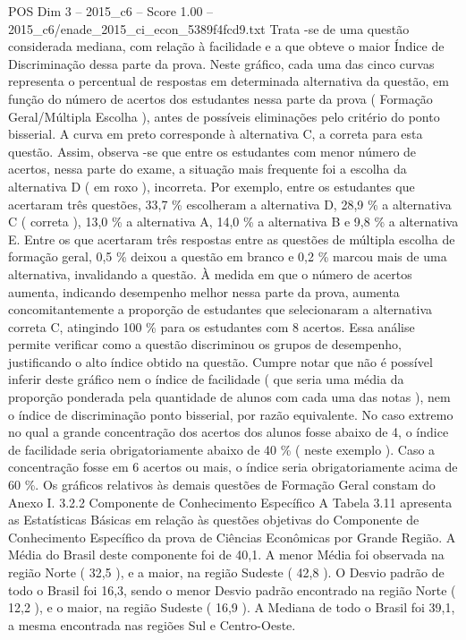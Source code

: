 \begin{textsample}{POS Dim 3 – 2015\_c6 – Score 1.00 – 2015\_c6/enade\_2015\_ci\_econ\_5389f4fcd9.txt}
Trata -se de uma questão considerada mediana, com relação à facilidade e a que obteve o maior Índice de Discriminação dessa parte da prova.
Neste gráfico, cada uma das cinco curvas representa o percentual de respostas em determinada alternativa da questão, em função do número de acertos dos estudantes nessa parte da prova ( Formação Geral/Múltipla Escolha ), antes de possíveis eliminações pelo critério do ponto bisserial.
A curva em preto corresponde à alternativa C, a correta para esta questão.
Assim, observa -se que entre os estudantes com menor número de acertos, nessa parte do exame, a situação mais frequente foi a escolha da alternativa D ( em roxo ), incorreta.
Por exemplo, entre os estudantes que acertaram três questões, 33,7 \% escolheram a alternativa D, 28,9 \% a alternativa C ( correta ), 13,0 \% a alternativa A, 14,0 \% a alternativa B e 9,8 \% a alternativa E.
Entre os que acertaram três respostas entre as questões de múltipla escolha de formação geral, 0,5 \% deixou a questão em branco e 0,2 \% marcou mais de uma alternativa, invalidando a questão.
À medida em que o número de acertos aumenta, indicando desempenho melhor nessa parte da prova, aumenta concomitantemente a proporção de estudantes que selecionaram a alternativa correta C, atingindo 100 \% para os estudantes com 8 acertos.
Essa análise permite verificar como a questão discriminou os grupos de desempenho, justificando o alto índice obtido na questão.
Cumpre notar que não é possível inferir deste gráfico nem o índice de facilidade ( que seria uma média da proporção ponderada pela quantidade de alunos com cada uma das notas ), nem o índice de discriminação ponto bisserial, por razão equivalente.
No caso extremo no qual a grande concentração dos acertos dos alunos fosse abaixo de 4, o índice de facilidade seria obrigatoriamente abaixo de 40 \% ( neste exemplo ).
Caso a concentração fosse em 6 acertos ou mais, o índice seria obrigatoriamente acima de 60 \%.
Os gráficos relativos às demais questões de Formação Geral constam do Anexo I. 3.2.2 Componente de Conhecimento Específico A Tabela 3.11 apresenta as Estatísticas Básicas em relação às questões objetivas do Componente de Conhecimento Específico da prova de Ciências Econômicas por Grande Região.
A Média do Brasil deste componente foi de 40,1.
A menor Média foi observada na região Norte ( 32,5 ), e a maior, na região Sudeste ( 42,8 ).
O Desvio padrão de todo o Brasil foi 16,3, sendo o menor Desvio padrão encontrado na região Norte ( 12,2 ), e o maior, na região Sudeste ( 16,9 ).
A Mediana de todo o Brasil foi 39,1, a mesma encontrada nas regiões Sul e Centro-Oeste.

\end{textsample}
